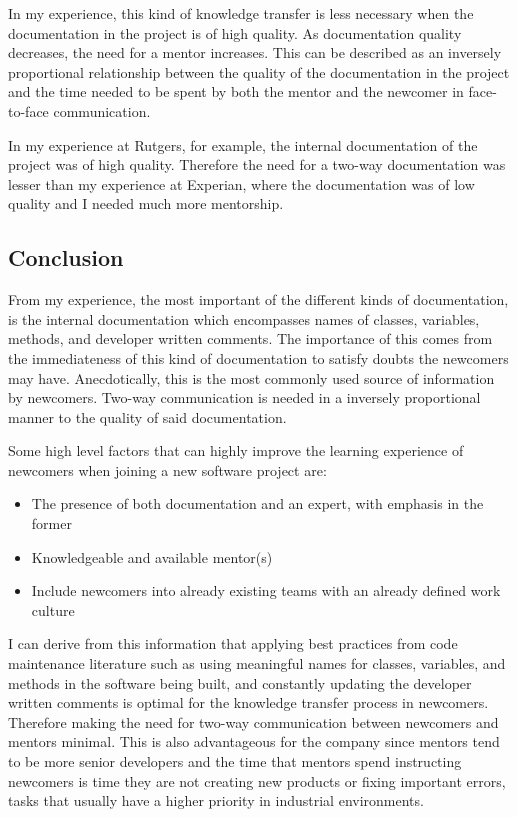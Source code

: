 \documentclass[12pt, letterpaper]{article}
\begin{document}
In my experience, this kind of knowledge transfer is less necessary when the documentation in the project is of high
quality. As documentation quality decreases, the need for a mentor increases. This can be described
as an inversely proportional relationship between the quality of the documentation in the project and the 
time needed to be spent by both the mentor and the newcomer in face-to-face communication.

In my experience at Rutgers, for example, the internal documentation of the project was of high quality. Therefore
the need for a two-way documentation was lesser than my experience at Experian, where the documentation was of low quality and 
I needed much more mentorship.

\subsection{Conclusion}

From my experience, the most 
important of the different kinds of documentation, is the internal documentation which encompasses
names of classes, variables, methods, and developer written comments. The importance of this comes from
the immediateness of this kind of documentation to satisfy doubts the newcomers may have.
Anecdotically, this is the most commonly used source of information by newcomers. 
Two-way communication is needed in a inversely 
proportional manner to the quality of said documentation.

Some high level factors that can highly improve the learning experience of newcomers when joining a new software 
project are:
\begin{itemize}
  \item The presence of both documentation and an expert, with emphasis in the former
  \item Knowledgeable and available mentor(s)
  \item Include newcomers into already existing teams with an already defined work culture 
\end{itemize}

I can derive from this information that applying best practices from code maintenance literature such as 
using meaningful names for classes, variables, and methods in the software being built, and constantly updating
the developer written comments is optimal for the knowledge transfer process in newcomers. Therefore making
the need for two-way communication between newcomers and mentors minimal. This is also advantageous for the
company since mentors tend to be more senior developers and the time that mentors spend instructing newcomers
is time they are not creating new products or fixing important errors, tasks that usually have a higher priority
in industrial environments.



 
\end{document}
